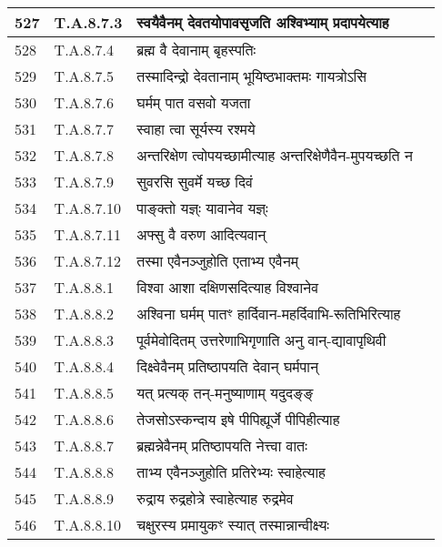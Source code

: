 \documentclass[17pt]{extarticle}
\begin{document}
\begin{longtable}{||p{0.4in}||p{0.9in}||p{4.0in}||p{0.9in}||}
        \hline
            527 & T.A.8.7.3 & स्वयैवैनम् देवतयोपावसृजति अश्विभ्याम् प्रदापयेत्याह &      \\
        \hline
            528 & T.A.8.7.4 & ब्रह्म वै देवानाम् बृहस्पतिः &      \\
        \hline
            529 & T.A.8.7.5 & तस्मादिन्द्रो देवतानाम् भूयिष्ठभाक्तमः गायत्रोऽसि &      \\
        \hline
            530 & T.A.8.7.6 & घर्मम् पात वसवो यजता &      \\
        \hline
            531 & T.A.8.7.7 & स्वाहा त्वा सूर्यस्य रश्मये &      \\
        \hline
            532 & T.A.8.7.8 & अन्तरिक्षेण त्वोपयच्छामीत्याह अन्तरिक्षेणैवैन{-}मुपयच्छति न &      \\
        \hline
            533 & T.A.8.7.9 & सुवरसि सुवर्मे यच्छ दिवं &      \\
        \hline
            534 & T.A.8.7.10 & पाङ्क्तो यज्ञ्ः यावानेव यज्ञ्ः &      \\
        \hline
            535 & T.A.8.7.11 & अफ्सु वै वरुण आदित्यवान् &      \\
        \hline
            536 & T.A.8.7.12 & तस्मा एवैनञ्जुहोति एताभ्य एवैनम् &      \\
        \hline
            537 & T.A.8.8.1 & विश्वा आशा दक्षिणसदित्याह विश्वानेव &      \\
        \hline
            538 & T.A.8.8.2 & अश्विना घर्मम् पातꣳ हार्दिवान{-}महर्दिवाभि{-}रूतिभिरित्याह &      \\
        \hline
            539 & T.A.8.8.3 & पूर्वमेवोदितम् उत्तरेणाभिगृणाति अनु वान्{-}द्यावापृथिवी &      \\
        \hline
            540 & T.A.8.8.4 & दिक्ष्वेवैनम् प्रतिष्ठापयति देवान् घर्मपान् &      \\
        \hline
            541 & T.A.8.8.5 & यत् प्रत्यक् तन्{-}मनुष्याणाम् यदुदङ्ङ् &      \\
        \hline
            542 & T.A.8.8.6 & तेजसोऽस्कन्दाय इषे पीपिह्यूर्जे पीपिहीत्याह &      \\
        \hline
            543 & T.A.8.8.7 & ब्रह्मन्नेवैनम् प्रतिष्ठापयति नेत्त्वा वातः &      \\
        \hline
            544 & T.A.8.8.8 & ताभ्य एवैनञ्जुहोति प्रतिरेभ्यः स्वाहेत्याह &      \\
        \hline
            545 & T.A.8.8.9 & रुद्राय रुद्रहोत्रे स्वाहेत्याह रुद्रमेव &      \\
        \hline
            546 & T.A.8.8.10 & चक्षुरस्य प्रमायुकꣳ स्यात् तस्मान्नान्वीक्ष्यः &      \\

\end{longtable}
\end{document}
